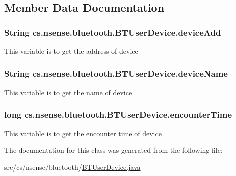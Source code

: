 \subsection{Member Data Documentation}
\hypertarget{classcs_1_1nsense_1_1bluetooth_1_1_b_t_user_device_ab2f5d68a784b0172e0b72108ebf8d5f5}{
\subsubsection[{device\-Add}]{\setlength{\rightskip}{0pt plus 5cm}String cs.\-nsense.\-bluetooth.\-B\-T\-User\-Device.\-device\-Add\hspace{0.3cm}{\ttfamily [private]}}}\label{classcs_1_1nsense_1_1bluetooth_1_1_b_t_user_device_ab2f5d68a784b0172e0b72108ebf8d5f5}
This variable is to get the address of device \hypertarget{classcs_1_1nsense_1_1bluetooth_1_1_b_t_user_device_af5d1136a1dd5fb98e2e4732cd2ee2d98}{
\subsubsection[{device\-Name}]{\setlength{\rightskip}{0pt plus 5cm}String cs.\-nsense.\-bluetooth.\-B\-T\-User\-Device.\-device\-Name\hspace{0.3cm}{\ttfamily [private]}}}\label{classcs_1_1nsense_1_1bluetooth_1_1_b_t_user_device_af5d1136a1dd5fb98e2e4732cd2ee2d98}
This variable is to get the name of device \hypertarget{classcs_1_1nsense_1_1bluetooth_1_1_b_t_user_device_a2fddaddbc2f53f2326d72dbe15433892}{
\subsubsection[{encounter\-Time}]{\setlength{\rightskip}{0pt plus 5cm}long cs.\-nsense.\-bluetooth.\-B\-T\-User\-Device.\-encounter\-Time\hspace{0.3cm}{\ttfamily [private]}}}\label{classcs_1_1nsense_1_1bluetooth_1_1_b_t_user_device_a2fddaddbc2f53f2326d72dbe15433892}
This variable is to get the encounter time of device 

The documentation for this class was generated from the following file\-:\begin{DoxyCompactItemize}
\item 
src/cs/nsense/bluetooth/\hyperlink{_b_t_user_device_8java}{B\-T\-User\-Device.\-java}\end{DoxyCompactItemize}
